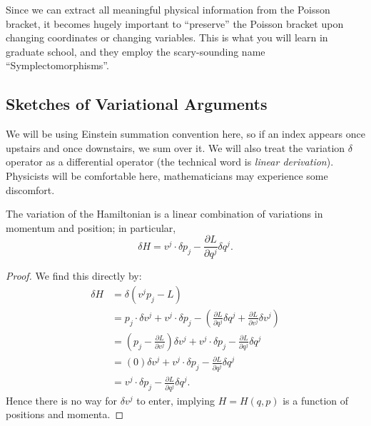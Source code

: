 Since we can extract all meaningful physical information from the
Poisson bracket, it becomes hugely important to ``preserve'' the Poisson
bracket upon changing coordinates or changing variables. This is what
you will learn in graduate school, and they employ the scary-sounding
name ``Symplectomorphisms''.

\subsection{Sketches of Variational Arguments}

 We will be using Einstein summation convention here,
so if an index appears once upstairs and once downstairs, we sum over it.
We will also treat the variation $\delta$ operator as a differential
operator (the technical word is \emph{linear derivation}). Physicists
will be comfortable here, mathematicians may experience some discomfort.



\begin{theorem}\label{thm:Hamiltonian-depends-on-p-and-q}
The variation of the Hamiltonian is a linear combination of variations
in momentum and position; in particular,
\begin{equation}\label{eq:variation-of-H}
\delta H = v^{j}\cdot\delta p_{j} - \frac{\partial L}{\partial q^{j}}\delta q^{j}.
\end{equation}
\end{theorem}

\begin{proof}
  We find this directly by:
  \begin{subequations}
    \begin{align}
\delta H
&= \delta(v^{j}p_{j} - L)\\
&= p_{j}\cdot\delta v^{j} + v^{j}\cdot\delta p_{j} -
\left(\frac{\partial L}{\partial q^{j}}\delta q^{j} + \frac{\partial L}{\partial v^{j}}\delta v^{j}\right)\\
&= \left(p_{j} - \frac{\partial L}{\partial v^{j}}\right)\delta v^{j}
+ v^{j}\cdot\delta p_{j} - \frac{\partial L}{\partial q^{j}}\delta q^{j}\\
&= (0)\delta v^{j} + v^{j}\cdot\delta p_{j} - \frac{\partial L}{\partial q^{j}}\delta q^{j}\\
&= v^{j}\cdot\delta p_{j} - \frac{\partial L}{\partial q^{j}}\delta q^{j}.
    \end{align}
  \end{subequations}
Hence there is no way for $\delta v^{j}$ to enter, implying $H=H(q,p)$
is a function of positions and momenta.
\end{proof}


